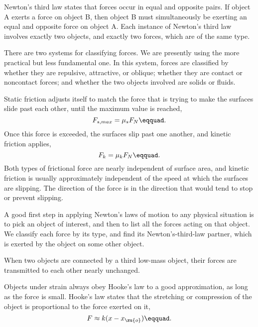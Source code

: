 \begin{summary}
\begin{notation}
\end{notation}

\begin{summarytext}

Newton's third law states that forces occur in equal and
opposite pairs. If object A exerts a force on object B,
then object B must simultaneously be exerting an equal and
opposite force on object A. Each instance of Newton's third
law involves exactly two objects, and exactly two forces,
which are of the same type.

There are two systems for classifying forces. We are
presently using the more practical but less fundamental one.
In this system, forces are classified by whether they are
repulsive, attractive, or oblique; whether they are contact
or noncontact forces; and whether the two objects involved
are solids or fluids.

Static friction adjusts itself to match the force that is
trying to make the surfaces slide past each other, until the
maximum value is reached,
\begin{equation*}
        F_{s,max} = \mu_s F_N\eqquad.
\end{equation*}
Once this force is exceeded, the surfaces slip past one
another, and kinetic friction applies,
\begin{equation*}
        F_k = \mu_k F_N\eqquad.
\end{equation*}
Both types of frictional force are nearly independent of
surface area, and kinetic friction is usually approximately
independent of the speed at which the surfaces are slipping.
The direction of the force is in the direction that would tend
to stop or prevent slipping.

A good first step in applying Newton's laws of motion to any
physical situation is to pick an object of interest, and
then to list all the forces acting on that object. We
classify each force by its type, and find its Newton's-third-law
partner, which is exerted by the object on some other object.

When two objects are connected by a third low-mass object,
their forces are transmitted to each other nearly unchanged.

Objects under strain always obey Hooke's law to a good
approximation, as long as the force is small. Hooke's law
states that the stretching or compression of the object is
proportional to the force exerted on it,
\begin{equation*}
    F \approx k(x-x_\zu{o})\eqquad.
\end{equation*}

\end{summarytext}

\end{summary}
